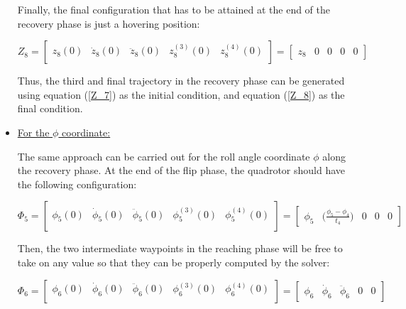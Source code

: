 \documentclass{thesisreport}
\begin{document}
\begin{itemize}
Finally, the final configuration that has to be attained at the end of the recovery phase is just a hovering position:

\begin{equation}\label{Z_8}
	Z_8 = \begin{bmatrix}
	z_8(0) & \dot{z}_8 (0) & \ddot{z}_8 (0) & z_8^{(3)} (0) & z_8^{(4)} (0) \\
	\end{bmatrix} = \begin{bmatrix}
	z_8 & 0 & 0 & 0 & 0
	\end{bmatrix} 
\end{equation}

Thus, the third and final trajectory in the recovery phase can be generated using equation (\ref{Z_7}) as the initial condition, and equation (\ref{Z_8}) as the final condition.


	\item \underline{For the $\phi$ coordinate:}

The same approach can be carried out for the roll angle coordinate $\phi$ along the recovery phase. At the end of the flip phase, the quadrotor should have the following configuration:

\begin{equation}\label{Phi_5}
	\Phi_5 = \begin{bmatrix}
	\phi_5(0) & \dot{\phi}_5 (0) & \ddot{\phi}_5 (0) & \phi_5^{(3)} (0) & \phi_5^{(4)} (0) \\
	\end{bmatrix} = \begin{bmatrix}
	\phi_5 & \bigg( \frac{\phi_5 - \phi_4}{t_4} \bigg) & 0 & 0 & 0
	\end{bmatrix} 
\end{equation}


Then, the two intermediate waypoints in the reaching phase will be free to take on any value so that they can be properly computed by the solver:


\begin{equation}\label{Phi_6}
	\Phi_6 = \begin{bmatrix}
	\phi_6(0) & \dot{\phi}_6 (0) & \ddot{\phi}_6 (0) & \phi_6^{(3)} (0) & \phi_6^{(4)} (0) \\
	\end{bmatrix} = \begin{bmatrix}
	\phi_6 & \dot{\phi}_6 & \ddot{\phi}_6 & 0 & 0
	\end{bmatrix} 
\end{equation}


\end{itemize}
\end{document}
